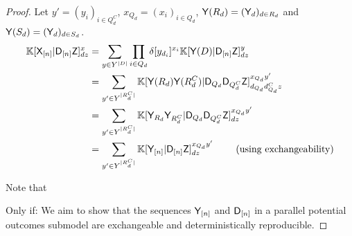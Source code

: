 \begin{proof}
Let $y'=(y_i)_{i\in Q_d^C}$, $x_{Q_d} = (x_i)_{i\in Q_d}$, $\mathsf{Y}(R_d)=(\mathsf{Y}_d)_{d\in R_d}$ and $\mathsf{Y}(S_d)=(\mathsf{Y}_d)_{d\in S_d}$.
\begin{align}
    \mathbb{K}[\mathsf{X}_{[n]}|\mathsf{D}_{[n]}\mathsf{Z}]^x_{dz} &= \sum_{y\in Y^{|D|}} \prod_{i\in Q_d} \delta[y_{d_i}]^{x_i} \mathbb{K}[\mathsf{Y}(D)|\mathsf{D}_{[n]}\mathsf{Z}]_{dz}^y\\
                                               &= \sum_{y'\in Y^{|R^C_d|}} \mathbb{K}[\mathsf{Y}(R_d)\mathsf{Y}(R^C_d)|\mathsf{D}_{Q_d}\mathsf{D}_{Q_d^C}\mathsf{Z}]_{d_{Q_d}d_{Q_d}^Cz}^{x_{Q_d}y'}\\
                                               &= \sum_{y'\in Y^{|R^C_d|}} \mathbb{K}[\mathsf{Y}_{R_d}\mathsf{Y}_{R^C_d}|\mathsf{D}_{Q_d}\mathsf{D}_{Q_d^C}\mathsf{Z}]_{dz}^{x_{Q_d}y'}\\
                                               &= \sum_{y'\in Y^{|R^C_d|}} \mathbb{K}[\mathsf{Y}_{[n]}|\mathsf{D}_{[n]}\mathsf{Z}]_{dz}^{x_{Q_d}y'}\qquad\text{ (using exchangeability})
\end{align}

Note that 



Only if:
We aim to show that the sequences $\mathsf{Y}_{[n]}$ and $\mathsf{D}_{[n]}$ in a parallel potential outcomes submodel are exchangeable and deterministically reproducible.
\end{proof}